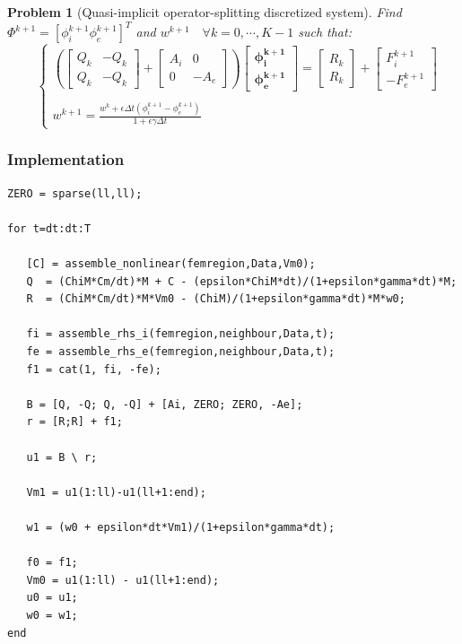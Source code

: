 \documentclass[a4paper,11pt]{article}
\newtheorem{problem}{Problem}
\begin{document}
\begin{problem} [Quasi-implicit operator-splitting discretized system]
Find $\Phi^{k+1}=[\phi_i^{k+1} \phi_e^{k+1}]^T$ and $w^{k+1} \quad \forall k=0, \cdots, K-1$ such that:
\begin{equation*}
\quad
\begin{cases}
\left(
\begin{bmatrix} Q_k & -Q_k \\ Q_k & -Q_k \end{bmatrix} + 
\begin{bmatrix} A_i & 0 \\ 0 & -A_e\end{bmatrix}
\right)
\begin{bmatrix}
\bm{\phi_i^{k+1}} \\ \bm{\phi_e^{k+1}}
\end{bmatrix}
= \begin{bmatrix} R_k \\ R_k \end{bmatrix} + \begin{bmatrix} F_i^{k+1} \\  -F_e^{k+1}\end{bmatrix} \\ \\
w^{k+1} = \frac{\displaystyle w^k + \epsilon \Delta t (\phi_i^{k+1}-\phi_e^{k+1})}{\displaystyle 1+\epsilon \gamma \Delta t}
\end{cases}
\end{equation*}
\end{problem}
\vspace{4mm}
\subsubsection{Implementation}
\begin{verbatim}
ZERO = sparse(ll,ll);
        
for t=dt:dt:T
        
   [C] = assemble_nonlinear(femregion,Data,Vm0);
   Q  = (ChiM*Cm/dt)*M + C - (epsilon*ChiM*dt)/(1+epsilon*gamma*dt)*M;
   R  = (ChiM*Cm/dt)*M*Vm0 - (ChiM)/(1+epsilon*gamma*dt)*M*w0;
    
   fi = assemble_rhs_i(femregion,neighbour,Data,t);
   fe = assemble_rhs_e(femregion,neighbour,Data,t);
   f1 = cat(1, fi, -fe);
    
   B = [Q, -Q; Q, -Q] + [Ai, ZERO; ZERO, -Ae];
   r = [R;R] + f1;
        
   u1 = B \ r; 
        
   Vm1 = u1(1:ll)-u1(ll+1:end);

   w1 = (w0 + epsilon*dt*Vm1)/(1+epsilon*gamma*dt);
    
   f0 = f1;
   Vm0 = u1(1:ll) - u1(ll+1:end);
   u0 = u1;
   w0 = w1;
end
\end{verbatim}
\end{document}
